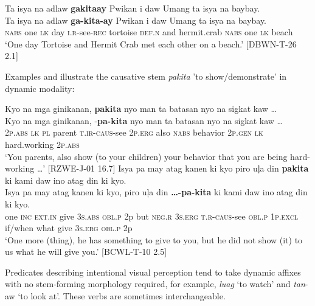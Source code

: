 \ea 
\label{bkm:Ref121468640}
Ta  isya  na  adlaw  \textbf{gakitaay}  Pwikan  i  daw Umang  ta  isya  na  baybay.\\
\gll Ta  isya  na  adlaw  \textbf{ga-kita-ay}  Pwikan  i  daw Umang  ta  isya  na  baybay.\\
\textsc{nabs}  one  \textsc{lk}  day  \textsc{i.r}-see-\textsc{rec}  tortoise  \textsc{def.n}  and
hermit.crab  \textsc{nabs}  one  \textsc{lk}  beach\\
\glt ‘One day Tortoise and Hermit Crab met each other on a beach.’ [DBWN-T-26 2.1]
\z  

Examples  and  illustrate the causative stem \textit{pakita} 'to show/demonstrate'  in dynamic modality:

\ea
\label{ex:hard-working}
Kyo na mga ginikanan, \textbf{pakita} nyo man ta batasan nyo na sigkat kaw … \\\smallskip
\gll Kyo	na	mga	ginikanan, \emptyset{}-\textbf{pa-kita}	nyo	man	ta	batasan	nyo	na	sigkat	kaw … \\
2\textsc{p.abs}	\textsc{lk}	\textsc{pl}	parent	\textsc{t.ir}-\textsc{caus}-see	2\textsc{p.erg}	also	\textsc{nabs}	behavior	2\textsc{p.gen}	\textsc{lk}	hard.working	2\textsc{p.abs} \\
\glt ‘You parents, also show (to your children) your behavior that you are being hard-working  …’ [RZWE-J-01 16.7]
\z
\ea
\label{ex:giveyou}
Isya pa may atag kanen ki kyo piro uļa din \textbf{pakita} ki kami  daw ino atag din ki kyo. \\\smallskip
\gll Isya	pa	may	atag	kanen	ki	kyo,	piro	uļa	din	\textbf{ …-pa-kita}	ki	kami	daw	ino	atag din	ki	kyo. \\
one	\textsc{inc}	\textsc{ext.in}	give	3\textsc{s.abs}	\textsc{obl.p}	2p	but	\textsc{neg.r}	3\textsc{s.erg}	\textsc{t.r-caus}-see	\textsc{obl.p}	1\textsc{p.excl}	if/when	what	give
3\textsc{s.erg}	\textsc{obl.p}	2p \\
\glt ‘One more (thing), he has something to give to you, but he did not show (it) to us what he will give you.’   [BCWL-T-10 2.5]
\z

Predicates describing intentional visual perception tend to take dynamic affixes with no stem-forming morphology required, for example, \textit{luag} ‘to watch’ and \textit{tan}{}-aw ‘to look at’. These verbs are sometimes interchangeable.

